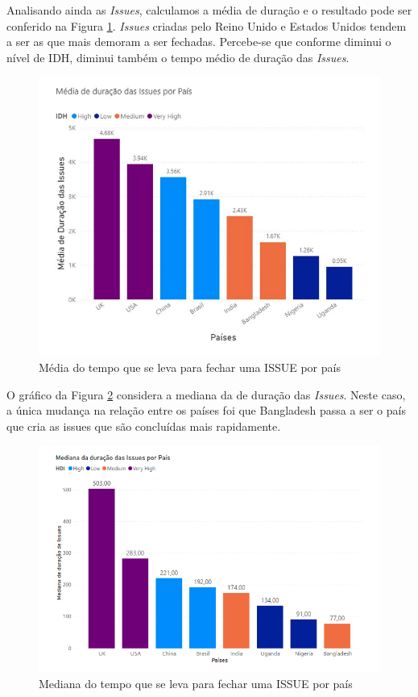 \documentclass[12pt]{article}
\begin{document}
Analisando ainda as \textit{Issues}, calculamos a média de duração e o resultado pode ser conferido na Figura \ref{fig:media_issue}. \textit{Issues} criadas pelo Reino Unido e Estados Unidos tendem a ser as que mais demoram a ser fechadas. Percebe-se que conforme diminui o nível de IDH, diminui também o tempo médio de duração das \textit{Issues}.



\begin{figure}[H]
\centering
\includegraphics[width=1\textwidth]{img/rq3/media dur issues.png}
\caption{Média do tempo que se leva para fechar uma ISSUE por país}
\label{fig:media_issue}
\end{figure}

O gráfico da Figura \ref{fig:mediana_issue} considera a mediana da de duração das \textit{Issues}. Neste caso, a única mudança na relação entre os países foi que Bangladesh passa a ser o país que cria as issues que são concluídas mais rapidamente.

\begin{figure}[H]
\centering
\includegraphics[width=1\textwidth]{img/rq3/mediana issues.png}
\caption{Mediana do tempo que se leva para fechar uma ISSUE por país}
\label{fig:mediana_issue}
\end{figure}
\end{document}
